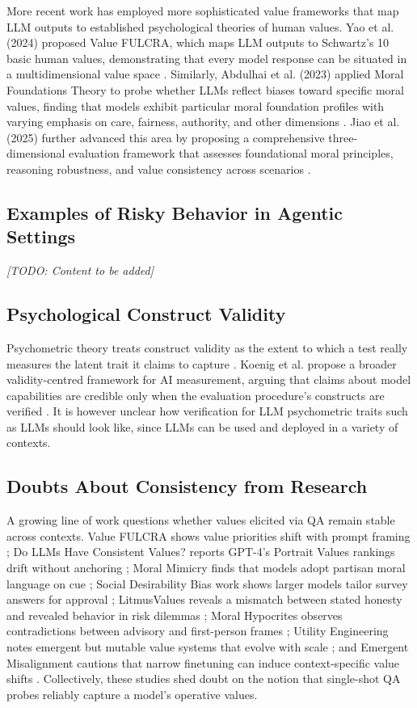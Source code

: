 \documentclass[11pt]{article}
\begin{document}
More recent work has employed more sophisticated value frameworks that map LLM outputs to established psychological theories of human values. Yao et al. (2024) proposed Value FULCRA, which maps LLM outputs to Schwartz's 10 basic human values, demonstrating that every model response can be situated in a multidimensional value space \cite{yao2024fulcra}. Similarly, Abdulhai et al. (2023) applied Moral Foundations Theory to probe whether LLMs reflect biases toward specific moral values, finding that models exhibit particular moral foundation profiles with varying emphasis on care, fairness, authority, and other dimensions \cite{abdulhai2023moral}. Jiao et al. (2025) further advanced this area by proposing a comprehensive three-dimensional evaluation framework that assesses foundational moral principles, reasoning robustness, and value consistency across scenarios \cite{jiao2025ethics}.

\subsection{Examples of Risky Behavior in Agentic Settings}
\textit{[TODO: Content to be added]}

\subsection{Psychological Construct Validity}
Psychometric theory treats construct validity as the extent to which a test really measures the latent trait it claims to capture \cite{cronbach1955}. Koenig et al. propose a broader validity-centred framework for AI measurement, arguing that claims about model capabilities are credible only when the evaluation procedure's constructs are verified \cite{koenig2024}. It is however unclear how verification for LLM psychometric traits such as LLMs should look like, since LLMs can be used and deployed in a variety of contexts.

\subsection{Doubts About Consistency from Research}
A growing line of work questions whether values elicited via QA remain stable across contexts. Value FULCRA shows value priorities shift with prompt framing \cite{yao2024}; Do LLMs Have Consistent Values? reports GPT-4's Portrait Values rankings drift without anchoring \cite{rozen2024}; Moral Mimicry finds that models adopt partisan moral language on cue \cite{simmons2023}; Social Desirability Bias work shows larger models tailor survey answers for approval \cite{salecha2025}; LitmusValues reveals a mismatch between stated honesty and revealed behavior in risk dilemmas \cite{chiu2025}; Moral Hypocrites observes contradictions between advisory and first-person frames \cite{nunes2024}; Utility Engineering notes emergent but mutable value systems that evolve with scale \cite{hubinger2025}; and Emergent Misalignment cautions that narrow finetuning can induce context-specific value shifts \cite{emergent2025}. Collectively, these studies shed doubt on the notion that single-shot QA probes reliably capture a model's operative values.
\end{document}
